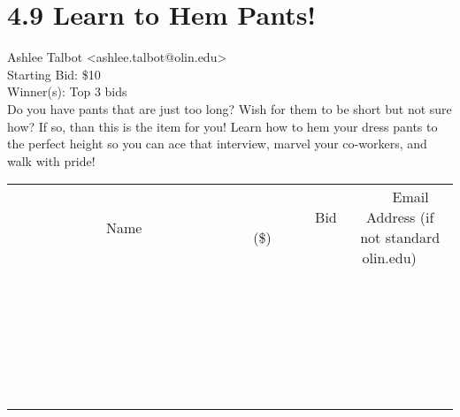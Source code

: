 \documentclass[11pt]{article}
\begin{document}
					\section*{4.9 Learn to Hem Pants!}
					Ashlee Talbot <ashlee.talbot@olin.edu> \\
					Starting Bid: \$10 \\
					Winner(s): Top 3 bids \\
					Do you have pants that are just too long? Wish for them to be short but not sure how? If so, than this is the item for you! Learn how to hem your dress pants to the perfect height so you can ace that interview, marvel your co-workers, and walk with pride! \\
					[6ex]
					\begin{tabular}{c c c}
						~~~~~~~~~~~~~Name~~~~~~~~~~~~~ & ~~~~~~~~~Bid (\$)~~~~~~~~~ & ~~~Email Address (if not standard olin.edu)~~~ \\
				
 & & \\
\hline
 & & \\
\hline
 & & \\
\hline
 & & \\
\hline
 & & \\
\hline
 & & \\
\hline
 & & \\
\hline
 & & \\
\hline
 & & \\
\hline
 & & \\
\hline
 & & \\
\hline
 & & \\
\hline
 & & \\
\hline
 & & \\
\hline
 & & \\
\hline
 & & \\
\hline
 & & \\
\hline
 & & \\
\hline
 & & \\
\hline
 & & \\
\hline
 & & \\
\hline
 & & \\
\hline
 & & \\
\hline
 & & \\
\hline
 & & \\
\hline
 & & \\
\hline
					\end{tabular}
					\clearpage
				
\end{document}
